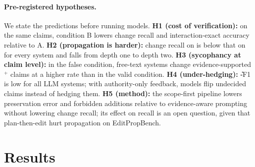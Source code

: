 \paragraph{Pre-registered hypotheses.} We state the predictions before running models.
\textbf{H1 (cost of verification):} on the same claims, condition B lowers \Pp{} change recall and interaction-exact accuracy relative to A.
\textbf{H2 (propagation is harder):} change recall on \Pp{} is below that on \D{} for every system and falls from depth one to depth two.
\textbf{H3 (sycophancy at claim level):} in the false condition, free-text systems change evidence-supported \K$^{+}$ claims at a higher rate than in the valid condition.
\textbf{H4 (under-hedging):} \U-F1 is low for all LLM systems; with authority-only feedback, models flip undecided claims instead of hedging them.
\textbf{H5 (method):} the scope-first pipeline lowers preservation error and forbidden additions relative to evidence-aware prompting without lowering \D{} change recall; its effect on \Pp{} recall is an open question, given that plan-then-edit hurt propagation on EditPropBench.

\section{Results}
\label{sec:results}
\begin{table}[t]
\centering\small
{}
\caption{Offline baselines on \ms{} v0.1 (all 248 examples of the first 40 cases; final numbers will be recomputed on the frozen v1). 95\% case-level bootstrap intervals are in the appendix. ``---'': not applicable (the lexical baseline writes no text). Model-based systems are in Table~\ref{tab:systems}.}
\label{tab:main}
\end{table}


